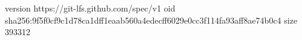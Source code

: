 version https://git-lfs.github.com/spec/v1
oid sha256:9f5f0cf9c1d78ca1dff1eaab560a4edecff6029e0cc3f114fa93aff8ae74b0c4
size 393312
